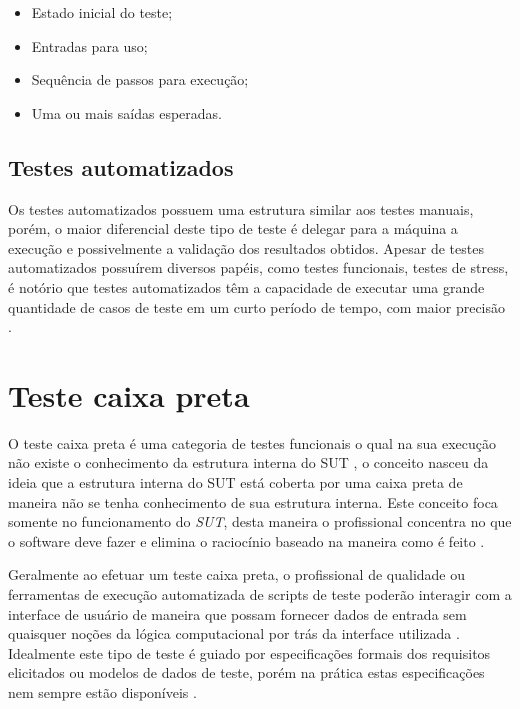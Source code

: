 \documentclass[
	12pt,				%
	oneside,			%
	a4paper,			%
	english,			%
	brazil				%
	]{abntex2ppgsi}
\begin{document}
\begin{itemize}
	\item Estado inicial do teste;
	\item Entradas para uso;
	\item Sequência de passos para execução; 
	\item Uma ou mais saídas esperadas.
\end{itemize}

\subsection{Testes automatizados}

Os testes automatizados possuem uma estrutura similar aos testes manuais, porém, o maior diferencial deste tipo de teste é delegar para a máquina a execução e possivelmente a validação dos resultados obtidos. Apesar de testes automatizados possuírem diversos papéis, como testes funcionais, testes de stress, é notório que testes automatizados têm a capacidade de executar uma grande quantidade de casos de teste em um curto período de tempo, com maior precisão \cite{Kaprocki2015}.

\section{Teste caixa preta}

O teste caixa preta é uma categoria de testes funcionais o qual na sua execução não existe o conhecimento da estrutura interna do SUT \cite{Xu2016}, o conceito nasceu da ideia que a estrutura interna do SUT está coberta por uma caixa preta de maneira não se tenha conhecimento de sua estrutura interna. Este conceito foca somente no funcionamento do \textit{SUT}, desta maneira o profissional concentra no que o software deve fazer e elimina o raciocínio baseado na maneira como é feito \cite{Jacob2016}.

Geralmente ao efetuar um teste caixa preta, o profissional de qualidade ou ferramentas de execução automatizada de scripts de teste poderão interagir com a interface de usuário de maneira que possam fornecer dados de entrada sem quaisquer noções da lógica computacional por trás da interface utilizada \cite{Xu2016}. Idealmente este tipo de teste é guiado por especificações formais dos requisitos elicitados ou modelos de dados de teste, porém na prática estas especificações nem sempre estão disponíveis \cite{Walkinshaw2017}.
\end{document}
